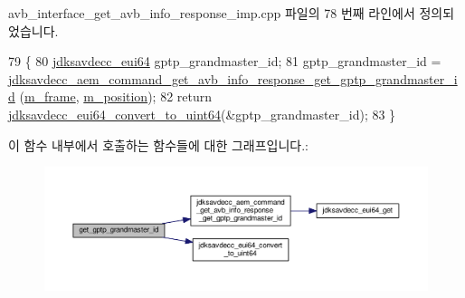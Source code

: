 avb\+\_\+interface\+\_\+get\+\_\+avb\+\_\+info\+\_\+response\+\_\+imp.\+cpp 파일의 78 번째 라인에서 정의되었습니다.


\begin{DoxyCode}
79 \{
80     \hyperlink{structjdksavdecc__eui64}{jdksavdecc\_eui64} gptp\_grandmaster\_id;
81     gptp\_grandmaster\_id = 
      \hyperlink{group__command__get__avb__info__response_ga8d77049563ce3ab9701d65b1b609e386}{jdksavdecc\_aem\_command\_get\_avb\_info\_response\_get\_gptp\_grandmaster\_id}
      (\hyperlink{classavdecc__lib_1_1avb__interface__get__avb__info__response__imp_a50417969cf438e7c8d698726bbbe2ff9}{m\_frame}, \hyperlink{classavdecc__lib_1_1avb__interface__get__avb__info__response__imp_af5e691c4a8a0feb07f48440b321206cd}{m\_position});
82     \textcolor{keywordflow}{return} \hyperlink{group__eui64_ga1c9a3634faa4bec90dea5a52e691bf63}{jdksavdecc\_eui64\_convert\_to\_uint64}(&gptp\_grandmaster\_id);
83 \}
\end{DoxyCode}


이 함수 내부에서 호출하는 함수들에 대한 그래프입니다.\+:
\nopagebreak
\begin{figure}[H]
\begin{center}
\leavevmode
\includegraphics[width=350pt]{classavdecc__lib_1_1avb__interface__get__avb__info__response__imp_addfa67bfe7d7660b056764a6d1c3ad8c_cgraph}
\end{center}
\end{figure}


